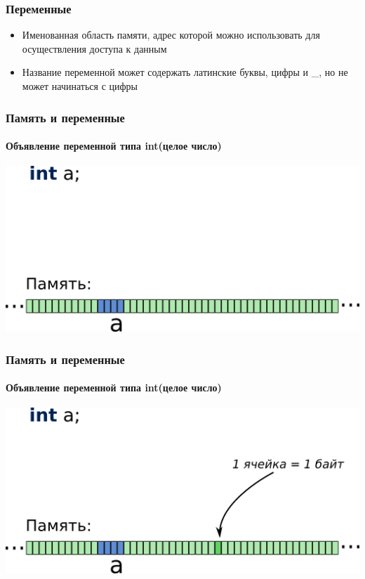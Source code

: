 \documentclass[12pt,pdf,hyperref={unicode}]{beamer}
\begin{document}
\begin{frame}
\frametitle{Переменные} 
\begin{center}
\begin{itemize}
\item Именованная область памяти, адрес которой можно использовать для осуществления доступа к данным
\item Название переменной может содержать латинские буквы, цифры и \_, но не может начинаться с цифры
\end{itemize}
\end{center}
\end{frame}


\begin{frame}[fragile]
\frametitle{Память и переменные} 
\framesubtitle{Объявление переменной типа int(целое число)} 
\begin{center}
\includegraphics[width=0.99\linewidth]{images/memory1.png}
\end{center}
\end{frame}

\begin{frame}[fragile]
\frametitle{Память и переменные} 
\framesubtitle{Объявление переменной типа int(целое число)} 
\begin{center}
\includegraphics[width=0.99\linewidth]{images/memory2.png}
\end{center}
\end{frame}
\end{document}
